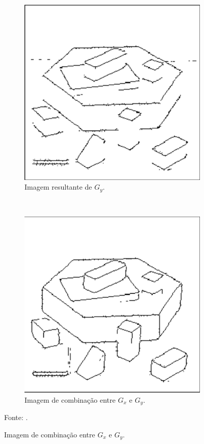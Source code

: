 \begin{figure}[H]
    \begin{subfigure}[t]{0.45\textwidth}
        \centering
        \includegraphics[width=1\linewidth]{recursos/imagens/image_seg/o3.png}
        \caption{Imagem resultante de $G_y$.}
        \label{segment:fig:7.3}
    \end{subfigure}
    ~
    \begin{subfigure}[t]{0.45\textwidth}
        \centering
        \includegraphics[width=1\linewidth]{recursos/imagens/image_seg/o4.png}
        \caption{Imagem de combinação entre $G_x$ e $G_y$.}
        \label{segment:fig:7.4}
    \end{subfigure}

    Fonte: \cite{pedrini2008analise}.
\end{figure}

